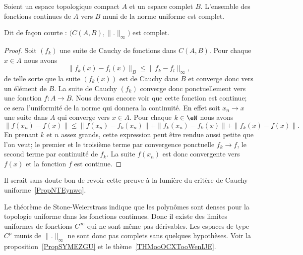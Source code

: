 \begin{lemma}       \label{LemdLKKnd}
    Soient un espace topologique compact \( A\) et un espace complet \( B\). L'ensemble des fonctions continues de \( A\) vers \( B\) muni de la norme uniforme est complet.

    Dit de façon courte : \( \big( C(A,B),\| . \|_{\infty} \big)\) est complet.
\end{lemma}

\begin{proof}
    Soit \( (f_k)\) une suite de Cauchy de fonctions dans \( C(A,B)\). Pour chaque \( x\in A \) nous avons
    \begin{equation}
        \| f_k(x)-f_l(x) \|_B\leq \| f_k-f_l \|_{\infty},
    \end{equation}
    de telle sorte que la suite \( (f_k(x))\) est de Cauchy dans \( B\) et converge donc vers un élément de \( B\). La suite de Cauchy \( (f_k)\) converge donc ponctuellement vers une fonction \( f\colon A\to B\). Nous devons encore voir que cette fonction est continue; ce sera l'uniformité de la norme qui donnera la continuité. En effet soit \( x_n\to x\) une suite dans \( A\) qui converge vers \( x\in A\). Pour chaque \( k\in \eN\) nous avons
    \begin{equation}
        \| f(x_n)-f(x) \|\leq \| f(x_n)-f_k(x_n) \|  +\| f_k(x_n)-f_k(x) \|+\| f_k(x)-f(x) \|.
    \end{equation}
    En prenant \( k\) et \( n\) assez grands, cette expression peut être rendue aussi petite que l'on veut; le premier et le troisième terme par convergence ponctuelle \( f_k\to f\), le second terme par continuité de \( f_k\). La suite \( f(x_n)\) est donc convergente vers \( f(x)\) et la fonction \( f\) est continue.
\end{proof}

\begin{probleme}
Il serait sans doute bon de revoir cette preuve à la lumière du critère de Cauchy uniforme~\ref{PropNTEynwq}.
\end{probleme}


\begin{normaltext}
    Le théorème de Stone-Weierstrass indique que les polynômes sont denses pour la topologie uniforme dans les fonctions continues. Donc il existe des limites uniformes de fonctions \( C^{\infty}\) qui ne sont même pas dérivables. Les espaces de type \( C^p\) munis de \( \| . \|_{\infty}\) ne sont donc pas complets sans quelques hypothèses. Voir la proposition~\ref{PropSYMEZGU} et le thème~\ref{THMooOCXTooWenIJE}.
\end{normaltext}

